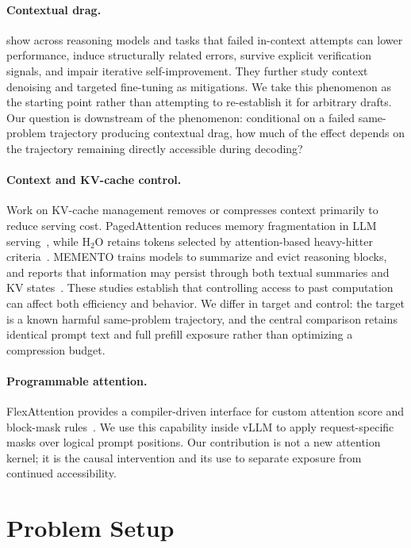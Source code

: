 \documentclass{article}
\begin{document}
\paragraph{Contextual drag.}
\citet{cheng2026contextualdrag} show across reasoning models and tasks that failed in-context attempts can lower performance, induce structurally related errors, survive explicit verification signals, and impair iterative self-improvement. They further study context denoising and targeted fine-tuning as mitigations. We take this phenomenon as the starting point rather than attempting to re-establish it for arbitrary drafts. Our question is downstream of the phenomenon: conditional on a failed same-problem trajectory producing contextual drag, how much of the effect depends on the trajectory remaining directly accessible during decoding?

\paragraph{Context and KV-cache control.}
Work on KV-cache management removes or compresses context primarily to reduce serving cost. PagedAttention reduces memory fragmentation in LLM serving~\citep{kwon2023pagedattention}, while H$_2$O retains tokens selected by attention-based heavy-hitter criteria~\citep{zhang2023h2o}. MEMENTO trains models to summarize and evict reasoning blocks, and reports that information may persist through both textual summaries and KV states~\citep{kontonis2026memento}. These studies establish that controlling access to past computation can affect both efficiency and behavior. We differ in target and control: the target is a known harmful same-problem trajectory, and the central comparison retains identical prompt text and full prefill exposure rather than optimizing a compression budget.

\paragraph{Programmable attention.}
FlexAttention provides a compiler-driven interface for custom attention score and block-mask rules~\citep{dong2024flexattention}. We use this capability inside vLLM to apply request-specific masks over logical prompt positions. Our contribution is not a new attention kernel; it is the causal intervention and its use to separate exposure from continued accessibility.

\section{Problem Setup}
\label{sec:setup}
\end{document}
